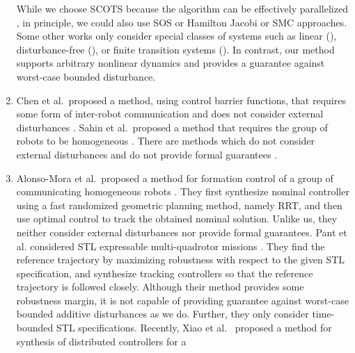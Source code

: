 \begin{enumerate}[(1)]
While we choose SCOTS because the algorithm can be effectively parallelized \cite{KhaledZ19pfaces}, in principle, we could
also use SOS or Hamilton Jacobi or SMC approaches. %
Some other works only consider special classes of systems such as linear (\cite{fan2018controller,wongpiromsarn2012receding,Rodionova2020LearningtoFlyLC}), 
disturbance-free (\cite{tedrake2010lqr,fan2020fast,Srinivasan2018}), or finite transition systems (\cite{Yang2017milp}). 
In contrast, our method supports arbitrary 
 nonlinear dynamics and provides a guarantee 
against worst-case bounded disturbance.
	\item Chen et al.\ proposed a method, using control barrier functions, that requires some form of inter-robot 
communication and does not consider external disturbances \cite{Chen2018cbf}.
Sahin et al.\ proposed a method that requires the group of robots to be homogeneous \cite{Shahin2017cltl}.
There are methods which do not consider external disturbances and do not provide formal guarantees \cite{jackson2020scalable}.
	\item Alonso-Mora et al.\ proposed a method for formation control of a group of communicating homogeneous robots \cite{alonso2019distributed}.
They first synthesize nominal controller using a fast randomized geometric planning method, namely RRT, and 
then use optimal control to track the obtained nominal solution.
Unlike us, they neither consider external disturbances nor provide formal guarantees. Pant et al. considered STL expressable multi-quadrotor missions \cite{Pant2018multiquad}. They find the reference trajectory by maximizing robustness with respect to the given STL specification, and synthesize tracking controllers so that the reference trajectory is followed closely. Although their method provides some robustness margin, it is not capable of providing guarantee against worst-case bounded additive disturbances as we do. Further, they only consider time-bounded STL specifications.	
Recently, Xiao et al.\ \cite{xiao2019merging} proposed a method for synthesis of distributed controllers for a 

\end{enumerate}

